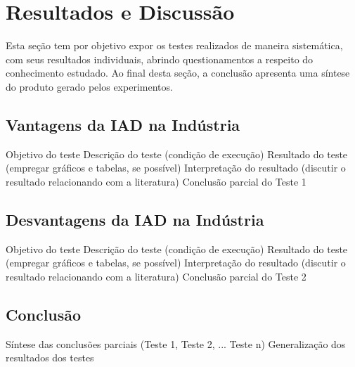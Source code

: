 \documentclass[
	article,			    %
	12pt,				    %
	oneside,			    %
	a4paper,			    %
	chapter=TITLE,		    %
	section=TITLE,		    %
	subsection=TITLE,	    %
	english,			    %
	brazil,				    %
	sumario=tradicional
]{abntex2}
\begin{document}
\section{Resultados e Discussão}
Esta seção tem por objetivo expor os testes realizados de maneira sistemática, com seus resultados individuais, abrindo questionamentos a respeito do conhecimento estudado. Ao final desta seção, a conclusão apresenta uma síntese do produto gerado pelos experimentos.

\subsection{Vantagens da IAD na Indústria}
Objetivo do teste
Descrição do teste (condição de execução)
Resultado do teste (empregar gráficos e tabelas, se possível)
Interpretação do resultado (discutir o resultado relacionando com a literatura)
Conclusão parcial do Teste 1

\subsection{Desvantagens da IAD na Indústria}
Objetivo do teste
Descrição do teste (condição de execução)
Resultado do teste (empregar gráficos e tabelas, se possível)
Interpretação do resultado (discutir o resultado relacionando com a literatura)
Conclusão parcial do Teste 2

\subsection{Conclusão}
Síntese das conclusões parciais (Teste 1, Teste 2, ... Teste n)
Generalização dos resultados dos testes

\end{document}
